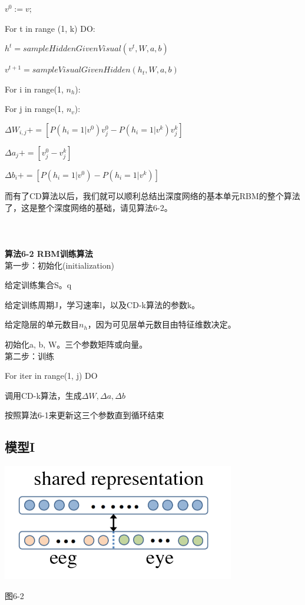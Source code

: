 		\qquad $v^0 := v;$
		
		\qquad For t in range (1, k) DO:
		
			\qquad \qquad $h^t= sampleHiddenGivenVisual (v^t, W, a, b)$
			
			\qquad \qquad $v^{t+1}= sampleVisualGivenHidden(h_t, W, a, b)$
			
		\qquad For i in range(1, $n_h$):
		
		\qquad \qquad For j in range(1, $n_v$):
		
		\qquad \qquad $\Delta W_{i, j} += [P(h_i = 1|v^0)v_j^0 - P(h_i = 1|v^k)v_j^k]$
		
		\qquad \qquad $\Delta a_j += [v_j^0 - v_j^k]$
		
		\qquad \qquad $\Delta b_i += [P(h_i = 1| v^0) - P(h_i = 1|v^k)]$
		
	而有了CD算法以后，我们就可以顺利总结出深度网络的基本单元RBM的整个算法了，这是整个深度网络的基础，请见算法6-2。\\ \\ \\ \\ 
	\textbf{算法6-2 RBM训练算法}\\
	第一步：初始化(initialization)
	
		\qquad 给定训练集合S。q
		
		\qquad 给定训练周期J，学习速率l，以及CD-k算法的参数k。
		
		\qquad 给定隐层的单元数目$n_h$，因为可见层单元数目由特征维数决定。
		
		\qquad 初始化a, b, W。三个参数矩阵或向量。\\
	第二步：训练
		
		\qquad For iter in range(1, j) DO
		
		\qquad \qquad 调用CD-k算法，生成$\Delta W, \Delta a, \Delta b$
		
		\qquad \qquad 按照算法6-1来更新这三个参数直到循环结束
		
	\subsection{模型I}
		\centerline{\includegraphics[width=4in]{figure/model1.png}} 
		\centerline{图6-2}
	
